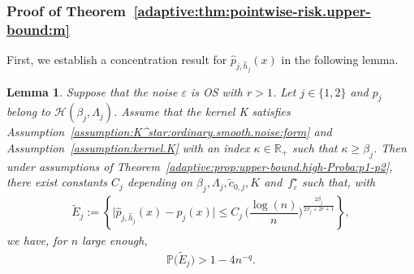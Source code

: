 \documentclass[11pt,a4paper,openany]{article}
\newtheorem{lem}[thm]{Lemma}
\begin{document}
\subsubsection{Proof of Theorem~\ref{adaptive:thm:pointwise-risk.upper-bound:m} }
\label{sec:adaptive:thm:pointwise-risk.upper-bound:m:proof}  
\noindent  
First, we establish a concentration result for    $\widehat{p}_{j,\widehat{h}_{j}}(x)$ in the following lemma. %
\begin{lem} \label{adaptive:thm:pointwise-risk.upper-bound:p1-p2}
Suppose that the noise $\varepsilon$ is OS  with $r > 1$.  Let $j \in \{ 1,  2 \} $ and  $p_{j}$ belong to $\mathcal{H}(\beta_{j}, \Lambda_{j})$. Assume that the kernel K satisfies Assumption~\ref{assumption:K^star:ordinary.smooth.noise:form} and  Assumption~\ref{assumption:kernel.K} with an index $\kappa \in \mathbb{R}_{+}$ such that $\kappa \geq  \beta_{j}$. 
Then under assumptions of Theorem~\ref{adaptive:prop:upper-bound.high-Proba:p1-p2},  there exist constants $C_{j}$  depending on $\beta_{j}, \Lambda_{j}, \tilde c_{0,j}, K$ and~$f_{\varepsilon}^{\star}$ such that, with  
	\begin{align*}
		\widetilde{E}_{j}  :=\left\{\big| \widehat{p}_{j,\widehat{h}_j}(x) - p_{j}(x) \big|  \leq C_{j}  \,  \Big( \dfrac{ \log(n) }{n} \Big)^{\frac{2 \beta_{j}}{2 \beta_{j} + 2 r + 1  }}   \right\}  ,  
	\end{align*}
	we have, for $n$ large enough, 
	\begin{align*}
		\mathbb{P} \Big( 	\widetilde{E}_{j}  \Big)  > 1 -  4 n^{-q} . 
	\end{align*}
\end{lem}
\end{document}
